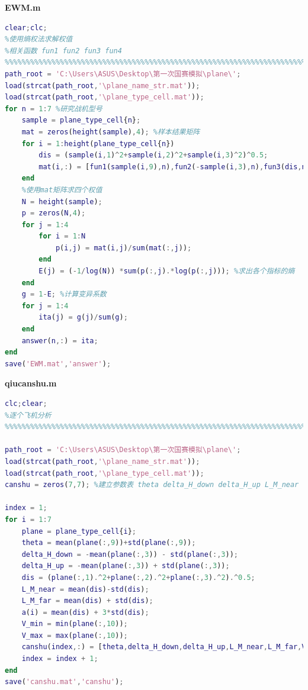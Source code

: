 \documentclass{my_paper}
\begin{document}
\textbf{EWM.m}
\begin{lstlisting}[language=matlab]
    %%%%%%%%%%%%%%%%%%%%%%%%%%%%%%%%%%%%%%%%%%%%%%%%%%%%%%%%%%%%%%%%%%%%%%%%%%%
clear;clc;
%使用熵权法求解权值
%相关函数 fun1 fun2 fun3 fun4
%%%%%%%%%%%%%%%%%%%%%%%%%%%%%%%%%%%%%%%%%%%%%%%%%%%%%%%%%%%%%%%%%%%%%%%%%%%
path_root = 'C:\Users\ASUS\Desktop\第一次国赛模拟\plane\';
load(strcat(path_root,'\plane_name_str.mat'));
load(strcat(path_root,'\plane_type_cell.mat'));
for n = 1:7 %研究战机型号
    sample = plane_type_cell{n};
    mat = zeros(height(sample),4); %样本结果矩阵
    for i = 1:height(plane_type_cell{n})
        dis = (sample(i,1)^2+sample(i,2)^2+sample(i,3)^2)^0.5;
        mat(i,:) = [fun1(sample(i,9),n),fun2(-sample(i,3),n),fun3(dis,n),fun4(dis,sample(i,10),sample(i,11),n)];
    end
    %使用mat矩阵求四个权值
    N = height(sample);
    p = zeros(N,4);
    for j = 1:4
        for i = 1:N
            p(i,j) = mat(i,j)/sum(mat(:,j));
        end
        E(j) = (-1/log(N)) *sum(p(:,j).*log(p(:,j))); %求出各个指标的熵 
    end
    g = 1-E; %计算变异系数
    for j = 1:4
        ita(j) = g(j)/sum(g);
    end
    answer(n,:) = ita; 
end
save('EWM.mat','answer');

\end{lstlisting}

\textbf{qiucanshu.m}
\begin{lstlisting}[language=matlab]
    %%%%%%%%%%%%%%%%%%%%%%%%%%%%%%%%%%%%%%%%%%%%%%%%%%%%%%%%%%%%%%%%%%%%%%%%%%%
clc;clear;
%逐个飞机分析 
%%%%%%%%%%%%%%%%%%%%%%%%%%%%%%%%%%%%%%%%%%%%%%%%%%%%%%%%%%%%%%%%%%%%%%%%%%%

path_root = 'C:\Users\ASUS\Desktop\第一次国赛模拟\plane\';
load(strcat(path_root,'\plane_name_str.mat'));
load(strcat(path_root,'\plane_type_cell.mat'));
canshu = zeros(7,7); %建立参数表 theta delta_H_down delta_H_up L_M_near L_M_far V_min V_max

index = 1;
for i = 1:7
    plane = plane_type_cell{i};
    theta = mean(plane(:,9))+std(plane(:,9));
    delta_H_down = -mean(plane(:,3)) - std(plane(:,3));
    delta_H_up = -mean(plane(:,3)) + std(plane(:,3));
    dis = (plane(:,1).^2+plane(:,2).^2+plane(:,3).^2).^0.5;
    L_M_near = mean(dis)-std(dis);
    L_M_far = mean(dis) + std(dis);
    a(i) = mean(dis) + 3*std(dis);
    V_min = min(plane(:,10));
    V_max = max(plane(:,10));
    canshu(index,:) = [theta,delta_H_down,delta_H_up,L_M_near,L_M_far,V_min,V_max];
    index = index + 1;
end
save('canshu.mat','canshu');

\end{lstlisting}
\end{document}
